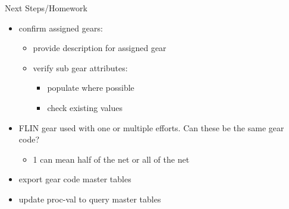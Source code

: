 \documentclass[bigger]{beamer}
\begin{document}
\begin{frame}[label=sec-21]{Next Steps/Homework}
\begin{itemize}
\item confirm assigned gears:
\begin{itemize}
\item provide description for assigned gear
\item verify sub gear attributes:
\begin{itemize}
\item populate where possible
\item check existing values
\end{itemize}
\end{itemize}
\item FLIN gear used with one or multiple efforts. Can these be the same gear
code?
\begin{itemize}
\item 1 can mean half of the net or all of the net
\end{itemize}
\item export gear code master tables
\item update proc-val to query master tables
\end{itemize}
\end{frame}
\end{document}
